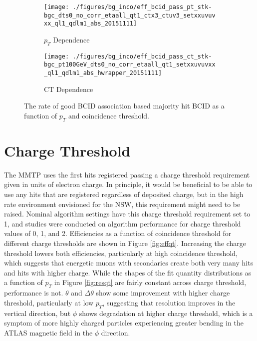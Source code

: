 \begin{figure}[!htbp]\captionsetup{justification=centering}
  \centering
  \begin{subfigure}{0.45\textwidth}\caption{$p_T$ Dependence}\texttt{[image: ./figures/bg\_inco/eff\_bcid\_pass\_pt\_stk-bgc\_dts0\_no\_corr\_etaall\_qt1\_ctx3\_ctuv3\_setxxuvuvxx\_ql1\_qdlm1\_abs\_20151111]}\end{subfigure}
  \begin{subfigure}{0.45\textwidth}\caption{CT Dependence}\texttt{[image: ./figures/bg\_inco/eff\_bcid\_pass\_ct\_stk-bgc\_pt100GeV\_dts0\_no\_corr\_etaall\_qt1\_setxxuvuvxx\_ql1\_qdlm1\_abs\_hwrapper\_20151111]}\end{subfigure}
  \caption{\label{fig:bcideff} The rate of good BCID association based majority hit BCID as a function of $p_T$ and coincidence threshold.}
\end{figure}

\section{Charge Threshold}
\label{subsec:qt}
The MMTP uses the first hits registered passing a charge threshold requirement given in units of electron charge.  In principle, it would be beneficial to be able to use any hits that are registered regardless of deposited charge, but in the high rate environment envisioned for the NSW, this requirement might need to be raised.  Nominal algorithm settings have this charge threshold requirement set to 1, and studies were conducted on algorithm performance for charge threshold values of 0, 1, and 2.  Efficiencies as a function of coincidence threshold for different charge thresholds are shown in Figure \ref{fig:effqt}.  Increasing the charge threshold lowers both efficiencies, particularly at high coincidence threshold, which suggests that energetic muons with secondaries create both very many hits and hits with higher charge.  While the shapes of the fit quantity distributions as a function of $p_T$ in Figure \ref{fig:resqt} are fairly constant across charge threshold, performance is not.  $\theta$ and $\Delta\theta$ show some improvement with higher charge threshold, particularly at low $p_T$, suggesting that resolution improves in the vertical direction, but $\phi$ shows degradation at higher charge threshold, which is a symptom of more highly charged particles experiencing greater bending in the ATLAS magnetic field in the $\phi$ direction.

